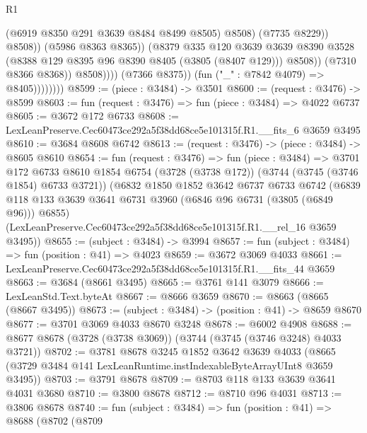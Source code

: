 \begin{lexlean}{R1}
\begin{coremodule}
                                          (@6919 @8350 @291 @3639 @8484 @8499 @8505)
                                          @8508)
                                        (@7735 @8229))
                                      @8508))
                                  (@5986 @8363 @8365))
                                (@8379
                                  @335
                                  @120
                                  @3639
                                  @3639
                                  @8390
                                  @3528
                                  (@8388 @129 @8395 @96 @8390 @8405 (@3805 (@8407 @129)))
                                  @8508))
                              (@7310 @8366 @8368))
                            @8508))))
                    (@7366 @8375))
                  (fun ("_" : @7842 @4079) => @8405))))))))
@8599 := (piece : @3484) -> @3501
@8600 := (request : @3476) -> @8599
@8603 := fun (request : @3476) => fun (piece : @3484) => @4022 @6737
@8605 := @3672 @172 @6733
@8608 := LexLeanPreserve.Cec60473ce292a5f38dd68ce5e101315f.R1.__fits_6 @3659 @3495
@8610 := @3684 @8608 @6742
@8613 := (request : @3476) -> (piece : @3484) -> @8605 @8610
@8654 := fun (request : @3476) =>
  fun (piece : @3484) =>
  @3701
    @172
    @6733
    @8610
    @1854
    @6754
    (@3728 (@3738 @172))
    (@3744 (@3745 (@3746 @1854) @6733 @3721))
    (@6832
      @1850
      @1852
      @3642
      @6737
      @6733
      @6742
      (@6839 @118 @133 @3639 @3641 @6731 @3960 (@6846 @96 @6731 (@3805 (@6849 @96))) @6855)
      (LexLeanPreserve.Cec60473ce292a5f38dd68ce5e101315f.R1.__rel_16 @3659 @3495))
@8655 := (subject : @3484) -> @3994
@8657 := fun (subject : @3484) => fun (position : @41) => @4023
@8659 := @3672 @3069 @4033
@8661 := LexLeanPreserve.Cec60473ce292a5f38dd68ce5e101315f.R1.__fits_44 @3659
@8663 := @3684 (@8661 @3495)
@8665 := @3761 @141 @3079
@8666 := LexLeanStd.Text.byteAt
@8667 := @8666 @3659
@8670 := @8663 (@8665 (@8667 @3495))
@8673 := (subject : @3484) -> (position : @41) -> @8659 @8670
@8677 := @3701 @3069 @4033 @8670 @3248
@8678 := @6002 @4908
@8688 := @8677 @8678 (@3728 (@3738 @3069)) (@3744 (@3745 (@3746 @3248) @4033 @3721))
@8702 := @3781
    @8678
    @3245
    @1852
    @3642
    @3639
    @4033
    (@8665 (@3729 @3484 @141 LexLeanRuntime.instIndexableByteArrayUInt8 @3659 @3495))
@8703 := @3791 @8678
@8709 := @8703 @118 @133 @3639 @3641 @4031 @3680
@8710 := @3800 @8678
@8712 := @8710 @96 @4031
@8713 := @3806 @8678
@8740 := fun (subject : @3484) =>
  fun (position : @41) =>
  @8688
    (@8702
      (@8709

\end{coremodule}
\end{lexlean}
